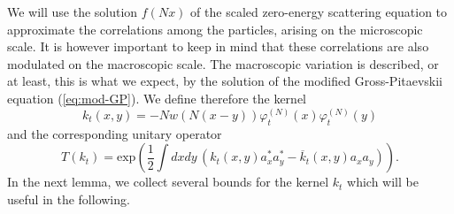 \documentclass[11pt,a4paper]{article}
\newcommand{\ph}{\varphi_t^{(N)}}	%
\begin{document}
We will use the solution $f(Nx)$ of the scaled zero-energy scattering
equation to approximate the correlations among the particles, arising on the
microscopic scale. It is however important to keep in mind that these
correlations are also modulated on the macroscopic scale. The macroscopic
variation is described, or at least, this is what we expect, by the solution of the modified Gross-Pitaevskii equation (\ref{eq:mod-GP}). We define therefore the kernel
\begin{equation}\label{eq:kt} 
k_t (x,y)  = - N w (N (x-y)) \ph (x) \ph (y) \end{equation}
and the corresponding unitary operator
 \[ T (k_t) = \text{exp} \left( \frac{1}{2} \int dx dy \, \left( k_t (x,y) a_x^* a_y^* - \overline{k}_t (x,y) a_x a_y \right)\right). \]
In the next lemma, we collect several bounds for the kernel $k_t$ which will be useful in the following. 
\end{document}
